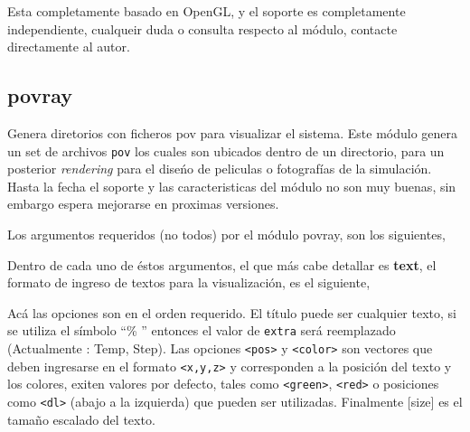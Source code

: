 Esta completamente basado en OpenGL, y el soporte es completamente independiente, cualqueir duda o consulta respecto al m\'odulo, contacte directamente al autor.
\subsection{povray}
Genera diretorios con ficheros pov para visualizar el sistema. Este m\'odulo genera un set de archivos \verb|pov| los cuales son ubicados dentro de un directorio, para un posterior \textit{rendering} para el dise\'no de peliculas o fotograf\'ias de la simulaci\'on. Hasta la fecha el soporte y las caracteristicas del m\'odulo no son muy buenas, sin embargo espera mejorarse en proximas versiones.

Los argumentos requeridos (no todos) por el m\'odulo povray, son los siguientes,


Dentro de cada uno de \'estos argumentos, el que m\'as cabe detallar es \textbf{text}, el formato de ingreso de textos para la visualizaci\'on, es el siguiente,


Ac\'a las opciones son en el orden requerido. El t\'itulo puede ser cualquier texto, si se utiliza el s\'imbolo ``\% '' entonces el valor de \verb|extra| ser\'a reemplazado (Actualmente : Temp, Step). Las opciones \verb|<pos>| y \verb|<color>| son vectores que deben ingresarse en el formato \verb|<x,y,z>| y corresponden a la posici\'on del texto y los colores, exiten valores por defecto, tales como \verb|<green>|, \verb|<red>| o posiciones como \verb|<dl>| (abajo a la izquierda) que pueden ser utilizadas. Finalmente [size] es el tama\~no escalado del texto.

